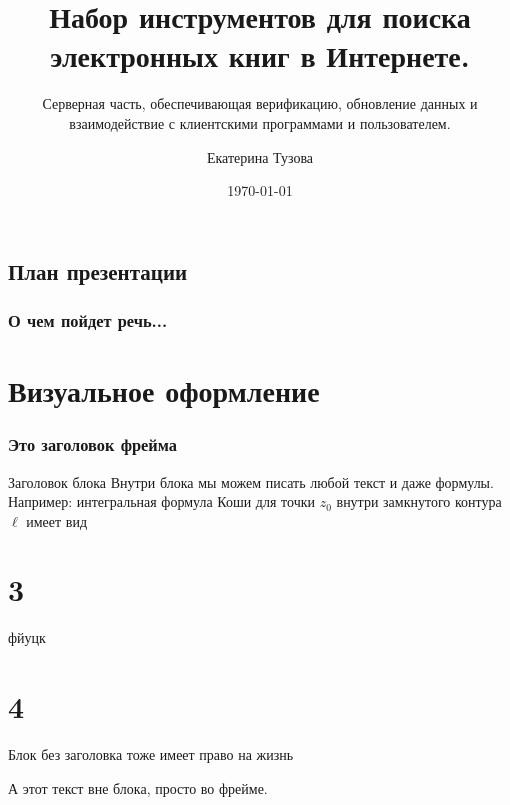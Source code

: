 \documentclass[handout]{beamer}
\title{Набор инструментов для поиска электронных книг в Интернете. }
\subtitle{Серверная часть, обеспечивающая верификацию, обновление данных и взаимодействие с клиентскими программами и пользователем.}
\author{Екатерина Тузова}
\institute{АУ РАН}
\date{\today}
\begin{document}
\begin{frame}
  \titlepage
\end{frame}


\begin{frame}
\section*{План презентации}
  \frametitle{О чем пойдет речь...}
  \tableofcontents[pausesections]
\end{frame}

\begin{frame}
\section{Визуальное оформление}
  \frametitle{Это заголовок фрейма}
  \begin{block}{Заголовок блока}
  Внутри блока мы можем писать любой текст и даже формулы.
  Например: интегральная формула Коши для точки $z_0$
  внутри замкнутого контура $\ell$ имеет вид
  \end{block}
  \section{3}
  фйуцк
    \section{4}
  \begin{block}{}
  Блок без заголовка тоже имеет право на жизнь
  \end{block}
  А этот текст вне блока, просто во фрейме.
\end{frame}
\end{document}
